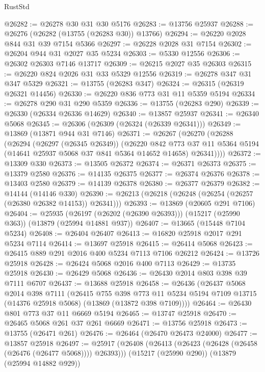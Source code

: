 \begin{lexlean}{RustStd}
\begin{coremodule}
@26282 := @26278 @30 @31 @30 @5176
@26283 := @13756 @25937
@26288 := @26276 (@26282 (@13755 (@26283 @30)) @13766)
@26294 := @26220 @2028 @844 @31 @39 @7154 @5366
@26297 := @26228 @2028 @31 @7154
@26302 := @26204 @944 @31 @2027 @35 @5234
@26303 := @5330 @12556
@26306 := @26302 @26303 @7146 @13717
@26309 := @26215 @2027 @35 @26303
@26315 := @26220 @824 @2026 @31 @33 @5329 @12556
@26319 := @26278 @347 @31 @347 @5329
@26321 := @13755 (@26283 @347)
@26324 := @26315 (@26319 @26321 @14456)
@26330 := @26220 @836 @773 @31 @11 @5359 @5194
@26334 := @26278 @290 @31 @290 @5359
@26336 := @13755 (@26283 @290)
@26339 := @26330 (@26334 @26336 @14629)
@26340 := @13857 @25937
@26341 := @26340 @5068
@26345 := @26306 (@26309 (@26324 (@26339 @26341)))
@26349 := @13869 (@13871 @944 @31 @7146)
@26371 := @26267
    (@26270
      (@26288
        (@26294
          (@26297 (@26345 @26349))
          (@26220
            @842
            @773
            @37
            @11
            @5364
            @5194
            (@14641 @25937 @5068 @37 @841 @5364 @14652 @14658)
            @26341))))
@26372 := @13309 @330
@26373 := @13505 @26372
@26374 := @26371 @26373
@26375 := @13379 @2580
@26376 := @14135 @26375
@26377 := @26374 @26376
@26378 := @13403 @2580
@26379 := @14139 @26378
@26380 := @26377 @26379
@26382 := @14144 (@14146 @330)
@26390 := @26213 (@26218 (@26248 (@26254 (@26257 (@26380 @26382 @14153)) @26341)))
@26393 := @13869 (@20605 @291 @7106)
@26404 := @25935
    (@26197 (@26202 (@26390 @26393)))
    (@15217 (@25990 @363))
    (@13879 (@25994 @14881 @937))
@26407 := @13665 (@15448 @7104 @5234)
@26408 := @26404 @26407
@26413 := @16820 @25918 @2017 @291 @5234 @7114
@26414 := @13697 @25918
@26415 := @26414 @5068
@26423 := @26415 @889 @291 @2016 @400 @5234 @7113 @7106 @26212
@26424 := @13726 @25918
@26428 := @26424 @5068 @2016 @400 @7113
@26429 := @13735 @25918
@26430 := @26429 @5068
@26436 := @26430 @2014 @803 @398 @39 @7111 @6707
@26437 := @13688 @25918
@26458 := @26436
    (@26437
      @5068
      @2014
      @398
      @7111
      (@26415
        @755
        @398
        @773
        @11
        @5234
        @5194
        @7109
        @13715
        (@14376 @25918 @5068)
        (@13869 (@13872 @398 @7109))))
@26464 := @26430 @801 @773 @37 @11 @6669 @5194
@26465 := @13747 @25918
@26470 := @26465 @5068 @261 @37 @261 @6669
@26471 := @13756 @25918
@26473 := @13755 (@26471 @261)
@26476 := @26464 (@26470 @26473 @24000)
@26477 := @13857 @25918
@26497 := @25917
    (@26408 (@26413 (@26423 (@26428 (@26458 (@26476 (@26477 @5068)))) @26393)))
    (@15217 (@25990 @290))
    (@13879 (@25994 @14882 @929))

\end{coremodule}
\end{lexlean}
